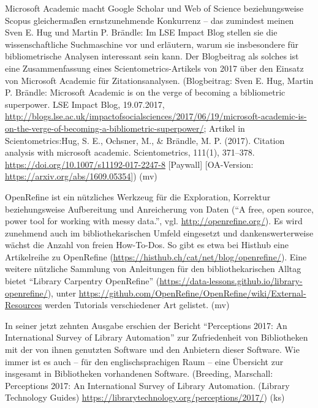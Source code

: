 \documentclass[a4paper,
fontsize=11pt,
oneside,
numbers=noperiodatend,
parskip=half-,
bibliography=totoc,
final
]{scrartcl}
\begin{document}
Microsoft Academic macht Google Scholar und Web of Science
beziehungsweise Scopus gleichermaßen ernstzunehmende Konkurrenz -- das
zumindest meinen Sven E. Hug und Martin P. Brändle: Im LSE Impact Blog
stellen sie die wissenschaftliche Suchmaschine vor und erläutern, warum
sie insbesondere für bibliometrische Analysen interessant sein kann. Der
Blogbeitrag als solches ist eine Zusammenfassung eines
Scientometrics-Artikels von 2017 über den Einsatz von Microsoft Academic
für Zitationsanalysen. (Blogbeitrag: Sven E. Hug, Martin P. Brändle:
Microsoft Academic is on the verge of becoming a bibliometric
superpower. LSE Impact Blog, 19.07.2017,
\url{http://blogs.lse.ac.uk/impactofsocialsciences/2017/06/19/microsoft-academic-is-on-the-verge-of-becoming-a-bibliometric-superpower/};
Artikel in Scientometrics:Hug, S. E., Ochsner, M., \& Brändle, M. P.
(2017). Citation analysis with microsoft academic. Scientometrics,
111(1), 371--378. \url{https://doi.org/10.1007/s11192-017-2247-8}
{[}Paywall{]} {[}OA-Version: \url{https://arxiv.org/abs/1609.05354}{]})
(mv)

OpenRefine ist ein nützliches Werkzeug für die Exploration, Korrektur
beziehungsweise Aufbereitung und Anreicherung von Daten (\enquote{A
free, open source, power tool for working with messy data.}, vgl.
\url{http://openrefine.org/}). Es wird zunehmend auch im
bibliothekarischen Umfeld eingesetzt und dankenswerterweise wächst die
Anzahl von freien How-To-Dos. So gibt es etwa bei Histhub eine
Artikelreihe zu OpenRefine
(\url{https://histhub.ch/cat/net/blog/openrefine/}). Eine weitere
nützliche Sammlung von Anleitungen für den bibliothekarischen Alltag
bietet \enquote{Library Carpentry OpenRefine}
(\url{https://data-lessons.github.io/library-openrefine/}), unter
\url{https://github.com/OpenRefine/OpenRefine/wiki/External-Resources}
werden Tutorials verschiedener Art gelistet. (mv)

In seiner jetzt zehnten Ausgabe erschien der Bericht
\enquote{Perceptions 2017: An International Survey of Library
Automation} zur Zufriedenheit von Bibliotheken mit der von ihnen
genutzten Software und den Anbietern dieser Software. Wie immer ist es
auch -- für den englischsprachigen Raum -- eine Übersicht zur insgesamt
in Bibliotheken vorhandenen Software. (Breeding, Marschall: Perceptions
2017: An International Survey of Library Automation. (Library Technology
Guides) \url{https://librarytechnology.org/perceptions/2017/}) (ks)
\end{document}
